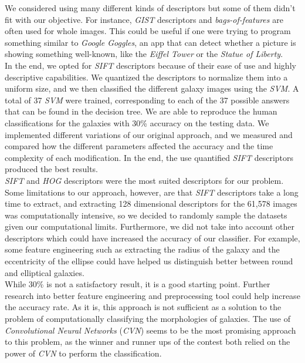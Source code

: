 \documentclass{vldb}
\begin{document}
We considered using many different kinds of descriptors but some of them didn’t fit with our objective. For instance, \emph{GIST} descriptors and \emph{bags-of-features} are often used for whole images. This could be useful if one were trying to program something similar to \emph{Google Goggles}, an app that can detect whether a picture is showing something well-known, like the \emph{Eiffel Tower} or the \emph{Statue of Liberty}. \\

In the end, we opted for \emph{SIFT} descriptors because of their ease of use and highly descriptive capabilities. We quantized the descriptors to normalize them into a uniform size, and we then classified the different galaxy images using the \emph{SVM}. A total of 37 \emph{SVM} were trained, corresponding to each of the 37 possible answers that can be found in the decision tree. We are able to reproduce the human classifications for the galaxies with 30\% accuracy on the testing data. We implemented different variations of our original approach, and we measured and compared how the different parameters affected the accuracy and the time complexity of each modification. In the end, the use quantified \emph{SIFT} descriptors produced the best results. \\

\emph{SIFT} and \emph{HOG} descriptors were the most suited descriptors for our problem. Some limitations to our approach, however, are that \emph{SIFT} descriptors take a long time to extract, and extracting 128 dimensional descriptors for the 61,578 images was computationally intensive, so we decided to randomly sample the datasets given our computational limits. Furthermore, we did not take into account other descriptors which could have increased the accuracy of our classifier. For example, some feature engineering such as extracting the radius of the galaxy and the eccentricity of the ellipse could have helped us distinguish better between round and elliptical galaxies. \\

While 30\% is not a satisfactory result, it is a good starting point. Further research into better feature engineering and preprocessing tool could help increase the accuracy rate. As it is, this approach is not sufficient as a solution to the problem of computationally classifying the morphologies of galaxies. The use of \emph{Convolutional Neural Networks} (\emph{CVN}) seems to be the most promising approach to this problem, as the winner and runner ups of the contest both relied on the power of \emph{CVN} to perform the classification.
\end{document}
